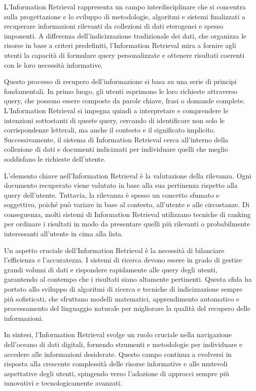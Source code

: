 L'Information Retrieval rappresenta un campo interdisciplinare che si concentra sulla progettazione e lo sviluppo di metodologie, algoritmi e sistemi finalizzati a recuperare informazioni rilevanti da collezioni di dati eterogenei e spesso imponenti. A differenza dell'indicizzazione tradizionale dei dati, che organizza le risorse in base a criteri predefiniti, l'Information Retrieval mira a fornire agli utenti la capacità di formulare query personalizzate e ottenere risultati coerenti con le loro necessità informative.

Questo processo di recupero dell'informazione si basa su una serie di principi fondamentali. In primo luogo, gli utenti esprimono le loro richieste attraverso query, che possono essere composte da parole chiave, frasi o domande complete. L'Information Retrieval si impegna quindi a interpretare e comprendere le intenzioni sottostanti di queste query, cercando di identificare non solo le corrispondenze letterali, ma anche il contesto e il significato implicito. Successivamente, il sistema di Information Retrieval cerca all'interno della collezione di dati e documenti indicizzati per individuare quelli che meglio soddisfano le richieste dell'utente.

L'elemento chiave nell'Information Retrieval è la valutazione della rilevanza. Ogni documento recuperato viene valutato in base alla sua pertinenza rispetto alla query dell'utente. Tuttavia, la rilevanza è spesso un concetto sfumato e soggettivo, poiché può variare in base al contesto, all'utente e alle circostanze. Di conseguenza, molti sistemi di Information Retrieval utilizzano tecniche di ranking per ordinare i risultati in modo da presentare quelli più rilevanti o probabilmente interessanti all'utente in cima alla lista.

Un aspetto cruciale dell'Information Retrieval è la necessità di bilanciare l'efficienza e l'accuratezza. I sistemi di ricerca devono essere in grado di gestire grandi volumi di dati e rispondere rapidamente alle query degli utenti, garantendo al contempo che i risultati siano altamente pertinenti. Questa sfida ha portato allo sviluppo di algoritmi di ricerca e tecniche di indicizzazione sempre più sofisticati, che sfruttano modelli matematici, apprendimento automatico e processamento del linguaggio naturale per migliorare la qualità del recupero delle informazioni.

In sintesi, l'Information Retrieval svolge un ruolo cruciale nella navigazione dell'oceano di dati digitali, fornendo strumenti e metodologie per individuare e accedere alle informazioni desiderate. Questo campo continua a evolversi in risposta alla crescente complessità delle risorse informative e alle mutevoli aspettative degli utenti, spingendo verso l'adozione di approcci sempre più innovativi e tecnologicamente avanzati.

